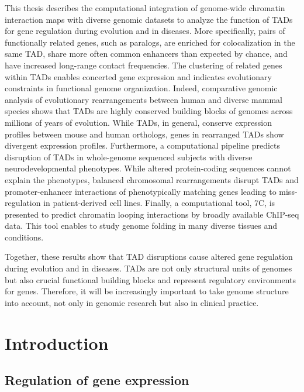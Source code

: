 \documentclass[a4paper,twoside=true,openright,parskip=full,chapterprefix=true,11pt,headings=normal,bibliography=totoc,listof=totoc,titlepage=on,captions=tableabove,draft=false]{scrreprt}
\theoremstyle{definition}
\theoremstyle{definition}
\theoremstyle{definition}
\theoremstyle{remark}
\begin{document}
This thesis describes the computational integration of genome-wide
chromatin interaction maps with diverse genomic datasets to analyze the
function of TADs for gene regulation during evolution and in diseases.
More specifically, pairs of functionally related genes, such as
paralogs, are enriched for colocalization in the same TAD, share more
often common enhancers than expected by chance, and have increased
long-range contact frequencies. The clustering of related genes within
TADs enables concerted gene expression and indicates evolutionary
constraints in functional genome organization. Indeed, comparative
genomic analysis of evolutionary rearrangements between human and
diverse mammal species shows that TADs are highly conserved building
blocks of genomes across millions of years of evolution. While TADs, in
general, conserve expression profiles between mouse and human orthologs,
genes in rearranged TADs show divergent expression profiles.
Furthermore, a computational pipeline predicts disruption of TADs in
whole-genome sequenced subjects with diverse neurodevelopmental
phenotypes. While altered protein-coding sequences cannot explain the
phenotypes, balanced chromosomal rearrangements disrupt TADs and
promoter-enhancer interactions of phenotypically matching genes leading
to miss-regulation in patient-derived cell lines. Finally, a
computational tool, 7C, is presented to predict chromatin looping
interactions by broadly available ChIP-seq data. This tool enables to
study genome folding in many diverse tissues and conditions.

Together, these results show that TAD disruptions cause altered gene
regulation during evolution and in diseases. TADs are not only
structural units of genomes but also crucial functional building blocks
and represent regulatory environments for genes. Therefore, it will be
increasingly important to take genome structure into account, not only
in genomic research but also in clinical practice.

\hypertarget{intro}{%
\chapter{Introduction}\label{intro}}

\hypertarget{regulation-of-expression}{%
\section{Regulation of gene expression}\label{regulation-of-expression}}
\end{document}
